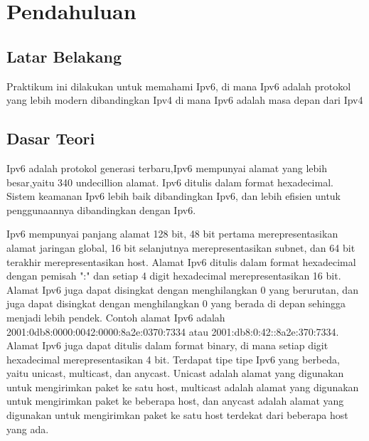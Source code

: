 \section{Pendahuluan}
\subsection{Latar Belakang}
Praktikum ini dilakukan untuk memahami Ipv6, di mana Ipv6 adalah protokol yang lebih modern dibandingkan
Ipv4 di mana Ipv6 adalah masa depan dari Ipv4

\subsection{Dasar Teori}
Ipv6 adalah protokol generasi terbaru,Ipv6 mempunyai alamat yang lebih besar,yaitu 340 undecillion alamat.
Ipv6 ditulis dalam format hexadecimal. Sistem keamanan Ipv6 lebih baik dibandingkan Ipv6, dan lebih efisien
untuk penggunaannya dibandingkan dengan Ipv6.

Ipv6 mempunyai panjang alamat 128 bit, 48 bit pertama merepresentasikan alamat jaringan global, 16 bit selanjutnya
merepresentasikan subnet, dan 64 bit terakhir merepresentasikan host. Alamat Ipv6 ditulis dalam format hexadecimal
dengan pemisah ":" dan setiap 4 digit hexadecimal merepresentasikan 16 bit. Alamat Ipv6 juga dapat disingkat
dengan menghilangkan 0 yang berurutan, dan juga dapat disingkat dengan menghilangkan 0 yang berada di depan
sehingga menjadi lebih pendek. Contoh alamat Ipv6 adalah 2001:0db8:0000:0042:0000:8a2e:0370:7334
atau 2001:db8:0:42::8a2e:370:7334. Alamat Ipv6 juga dapat ditulis dalam format binary, di mana setiap digit
hexadecimal merepresentasikan 4 bit. Terdapat tipe tipe Ipv6 yang berbeda, yaitu unicast, multicast, dan anycast.
Unicast adalah alamat yang digunakan untuk mengirimkan paket ke satu host, multicast adalah alamat yang digunakan
untuk mengirimkan paket ke beberapa host, dan anycast adalah alamat yang digunakan untuk mengirimkan paket
ke satu host terdekat dari beberapa host yang ada.	

